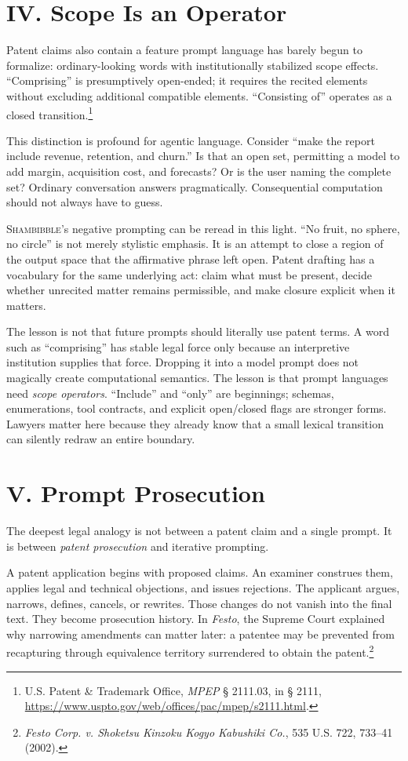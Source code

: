 \documentclass[11pt]{article}
\newcommand{\sham}{\textsc{Shambibble}\xspace}
\begin{document}
\section*{IV. Scope Is an Operator}
Patent claims also contain a feature prompt language has barely begun to formalize: ordinary-looking words with institutionally stabilized scope effects. ``Comprising'' is presumptively open-ended; it requires the recited elements without excluding additional compatible elements. ``Consisting of'' operates as a closed transition.\footnote{U.S. Patent \& Trademark Office, \emph{MPEP} § 2111.03, in § 2111, \url{https://www.uspto.gov/web/offices/pac/mpep/s2111.html}.}

This distinction is profound for agentic language. Consider ``make the report include revenue, retention, and churn.'' Is that an open set, permitting a model to add margin, acquisition cost, and forecasts? Or is the user naming the complete set? Ordinary conversation answers pragmatically. Consequential computation should not always have to guess.

\sham's negative prompting can be reread in this light. ``No fruit, no sphere, no circle'' is not merely stylistic emphasis. It is an attempt to close a region of the output space that the affirmative phrase left open. Patent drafting has a vocabulary for the same underlying act: claim what must be present, decide whether unrecited matter remains permissible, and make closure explicit when it matters.

The lesson is not that future prompts should literally use patent terms. A word such as ``comprising'' has stable legal force only because an interpretive institution supplies that force. Dropping it into a model prompt does not magically create computational semantics. The lesson is that prompt languages need \emph{scope operators}. ``Include'' and ``only'' are beginnings; schemas, enumerations, tool contracts, and explicit open/closed flags are stronger forms. Lawyers matter here because they already know that a small lexical transition can silently redraw an entire boundary.

\section*{V. Prompt Prosecution}
The deepest legal analogy is not between a patent claim and a single prompt. It is between \emph{patent prosecution} and iterative prompting.

A patent application begins with proposed claims. An examiner construes them, applies legal and technical objections, and issues rejections. The applicant argues, narrows, defines, cancels, or rewrites. Those changes do not vanish into the final text. They become prosecution history. In \emph{Festo}, the Supreme Court explained why narrowing amendments can matter later: a patentee may be prevented from recapturing through equivalence territory surrendered to obtain the patent.\footnote{\emph{Festo Corp. v. Shoketsu Kinzoku Kogyo Kabushiki Co.}, 535 U.S. 722, 733--41 (2002).}
\end{document}
